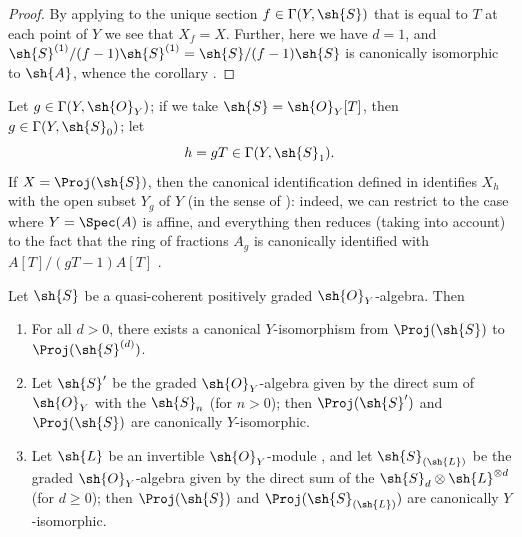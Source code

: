 \begin{proof}
By applying  to the unique section $f\in\Gamma(Y,\sh{S})$ that is equal to $T$ at each point of $Y$ we see that $X_f=X$.
Further, here we have $d=1$, and $\sh{S}^{(1)}/(f-1)\sh{S}^{(1)}=\sh{S}/(f-1)\sh{S}$ is canonically isomorphic to $\sh{A}$, whence the corollary .
\end{proof}

Let $g\in\Gamma(Y,\sh{O}_Y)$;
if we take $\sh{S}=\sh{O}_Y[T]$, then $g\in\Gamma(Y,\sh{S}_0)$;
let
\[
  h = gT\in\Gamma(Y,\sh{S}_1).
\]
If $X=\Proj(\sh{S})$, then the canonical identification defined in  identifies $X_h$ with the open subset $Y_g$ of $Y$ (in the sense of ):
indeed, we can restrict to the case where $Y=\Spec(A)$ is affine, and everything then reduces (taking  into account) to the fact that the ring of fractions $A_g$ is canonically identified with $A[T]/(gT-1)A[T]$ .

\begin{proposition}[3.1.8]
\label{II.3.1.8}
Let $\sh{S}$ be a quasi-coherent positively graded $\sh{O}_Y$-algebra.
Then
\begin{enumerate}
  \item[(i)] For all $d>0$, there exists a canonical $Y$-isomorphism from $\Proj(\sh{S})$ to $\Proj(\sh{S}^{(d)})$.
  \item[(ii)] Let $\sh{S}'$ be the graded $\sh{O}_Y$-algebra given by the direct sum of $\sh{O}_Y$ with the $\sh{S}_n$ (for $n>0$);
    then $\Proj(\sh{S}')$ and $\Proj(\sh{S})$ are canonically $Y$-isomorphic.
  \item[(iii)] Let $\sh{L}$ be an invertible $\sh{O}_Y$-module , and let $\sh{S}_{(\sh{L})}$ be the graded $\sh{O}_Y$-algebra given by the direct sum of the $\sh{S}_d\otimes\sh{L}^{\otimes d}$ (for $d\geq0$);
    then $\Proj(\sh{S})$ and $\Proj(\sh{S}_{(\sh{L})})$ are canonically $Y$-isomorphic.
\end{enumerate}
\end{proposition}

